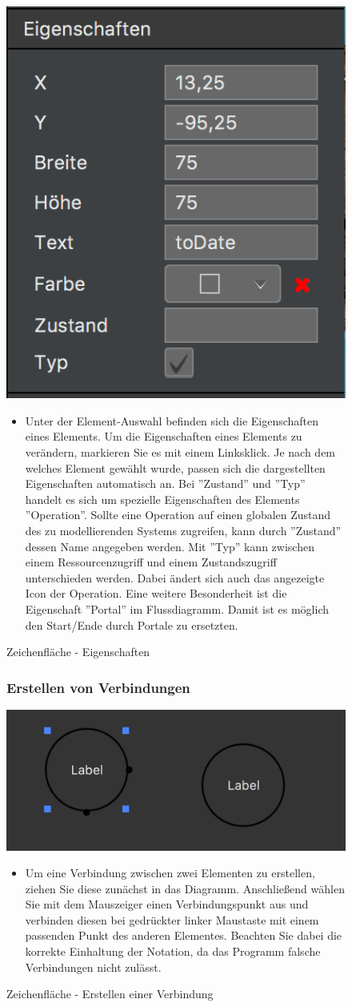 \begin{figure}[h!]
	\centering
	\includegraphics[width=.4\textwidth]{Eigenschaften.png}
	\caption{Zeichenfläche - Eigenschaften}	
\begin{itemize}	
\item Unter der Element-Auswahl befinden sich die Eigenschaften eines Elements. Um die Eigenschaften eines Elements zu verändern, markieren Sie es mit einem Linksklick. Je nach dem welches Element gewählt wurde, passen sich die dargestellten Eigenschaften automatisch an. Bei ''Zustand'' und ''Typ'' handelt es sich um spezielle Eigenschaften des Elements ''Operation''. Sollte eine Operation auf einen globalen Zustand des zu modellierenden Systems zugreifen, kann durch ''Zustand'' dessen Name angegeben werden. Mit ''Typ'' kann zwischen einem Ressourcenzugriff und einem Zustandszugriff unterschieden werden. Dabei ändert sich auch das angezeigte Icon der Operation. Eine weitere Besonderheit ist die Eigenschaft ''Portal'' im Flussdiagramm. Damit ist es möglich den Start/Ende durch Portale zu ersetzten.
\end{itemize}
\end{figure}

\begin{figure}[h!]
\subsubsection{Erstellen von Verbindungen}
	\centering
	\includegraphics[width=.4\textwidth]{Zeichenflaeche_Basics.png}
	\caption{Zeichenfläche - Erstellen einer Verbindung}	
\begin{itemize}	
\item Um eine Verbindung zwischen zwei Elementen zu erstellen, ziehen Sie diese zunächst in das Diagramm. Anschließend wählen Sie mit dem Mauszeiger einen Verbindungspunkt aus und verbinden diesen bei gedrückter linker Maustaste mit einem passenden Punkt des anderen Elementes. Beachten Sie dabei die korrekte Einhaltung der Notation, da das Programm falsche Verbindungen nicht zulässt. 
\end{itemize}
\end{figure}

